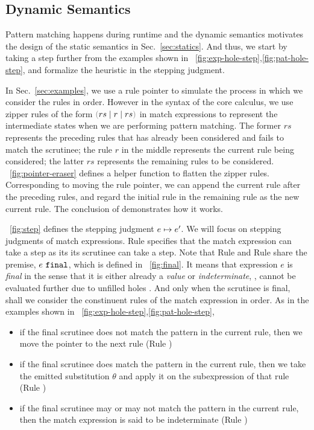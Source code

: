 \documentclass[runningheads,envcountsame,a4paper]{llncs}
\begin{document}
\subsection{Dynamic Semantics}\label{sec:dynamics}
Pattern matching happens during runtime and the dynamic semantics motivates the
design of the static semantics in Sec.~\ref{sec:statics}. And thus, we start by
taking a step further from the examples shown in
\listfigurename~\ref{fig:exp-hole-step},\ref{fig:pat-hole-step}, and formalize
the heuristic in the stepping judgment.




In Sec.~\ref{sec:examples}, we use a rule pointer to simulate the process in
which we consider the rules in order. However in the syntax of the core
calculus, we use zipper rules of the form $\zrulsP{rs}{r}{rs}$ in match
expressions to represent the intermediate states when we are performing pattern
matching. The former $rs$ represents the preceding rules that has already been
considered and fails to match the scrutinee; the rule $r$ in the middle
represents the current rule being considered; the latter $rs$ represents the
remaining rules to be considered. \figurename~\ref{fig:pointer-eraser} defines a helper function to flatten the zipper rules. Corresponding to moving the rule pointer, we
can append the current rule after the preceding rules, and regard the initial
rule in the remaining rule as the new current rule. The conclusion of
\ITFailMatch demonstrates how it works. 



\figurename~\ref{fig:step} defines the stepping judgment
$e \mapsto e'$. We will focus on stepping judgments of match expressions.
Rule \ITExpMatch specifies that the match expression can take a step as its its
scrutinee can take a step. Note that Rule \ITFailMatch and Rule \ITSuccMatch
share the premise, $e ~\mathtt{final}$, which is defined in \figurename~\ref{fig:final}. It
means that expression $e$ is \textit{final} in the sense that it is either already a
\textit{value} or \textit{indeterminate}, \ie, cannot be evaluated further due to unfilled holes
\cite{DBLP:journals/pacmpl/OmarVCH19}. And only when the scrutinee is final,
shall we consider the constinuent rules of the match expression in order. As in
the examples shown in \listfigurename~\ref{fig:exp-hole-step},\ref{fig:pat-hole-step},

\begin{itemize}
  \item
    if the final scrutinee does not match the pattern in the current rule,
    then we move the pointer to the next rule (Rule \ITFailMatch)

  \item
    if the final scrutinee does match the pattern in the current rule, 
    then we take the emitted substitution $\theta$ and apply it on the subexpression of that rule (Rule \ITSuccMatch)

  \item 
    if the final scrutinee may or may not match the pattern in the current rule,
    then the match expression is said to be indeterminate (Rule \IMatch)
\end{itemize}
\end{document}
